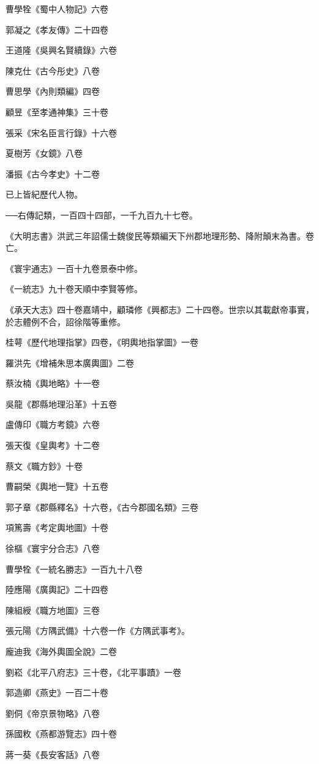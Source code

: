 曹學牷《蜀中人物記》六卷

郭凝之《孝友傳》二十四卷

王道隆《吳興名賢續錄》六卷

陳克仕《古今彤史》八卷

曹思學《內則類編》四卷

顧昱《至孝通神集》三十卷

張采《宋名臣言行錄》十六卷

夏樹芳《女鏡》八卷

潘振《古今孝史》十二卷

已上皆紀歷代人物。

──右傳記類，一百四十四部，一千九百九十七卷。

《大明志書》洪武三年詔儒士魏俊民等類編天下州郡地理形勢、降附顛末為書。卷亡。

《寰宇通志》一百十九卷景泰中修。

《一統志》九十卷天順中李賢等修。

《承天大志》四十卷嘉靖中，顧璘修《興都志》二十四卷。世宗以其載獻帝事實，於志體例不合，詔徐階等重修。

桂萼《歷代地理指掌》四卷，《明輿地指掌圖》一卷

羅洪先《增補朱思本廣輿圖》二卷

蔡汝楠《輿地略》十一卷

吳龍《郡縣地理沿革》十五卷

盧傳印《職方考鏡》六卷

張天復《皇輿考》十二卷

蔡文《職方鈔》十卷

曹嗣榮《輿地一覽》十五卷

郭子章《郡縣釋名》十六卷，《古今郡國名類》三卷

項篤壽《考定輿地圖》十卷

徐樞《寰宇分合志》八卷

曹學牷《一統名勝志》一百九十八卷

陸應陽《廣輿記》二十四卷

陳組綬《職方地圖》三卷

張元陽《方隅武備》十六卷一作《方隅武事考》。

龐迪我《海外輿圖全說》二卷

劉崧《北平八府志》三十卷，《北平事蹟》一卷

郭造卿《燕史》一百二十卷

劉侗《帝京景物略》八卷

孫國敉《燕都游覽志》四十卷

蔣一葵《長安客話》八卷

